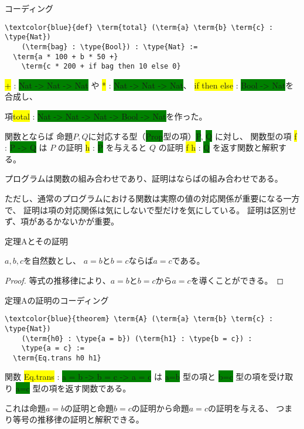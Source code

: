 \documentclass[unicode,12pt]{beamer}%
\newcommand{\type}[1]{\colorbox{green}{#1}}
\newcommand{\term}[1]{\colorbox{yellow}{#1}}
\begin{document}
\begin{frame}[fragile]{コーディング}
  \begin{tcolorbox}[title=SecondTheorems.lean]
  \setlength{\baselineskip}{12pt}
  \begin{Verbatim}[commandchars=\\\{\}, baselinestretch=1.5]
\textcolor{blue}{def} \term{total} (\term{a} \term{b} \term{c} : \type{Nat})
    (\term{bag} : \type{Bool}) : \type{Nat} :=
  \term{a * 100 + b * 50 +}
    \term{c * 200 + if bag then 10 else 0}
  \end{Verbatim}
  \end{tcolorbox}

  \term{+} : \type{Nat -> Nat -> Nat} や \term{*} : \type{Nat -> Nat -> Nat}、
  \term{if then else} : \type{Bool -> Nat}を合成し、

  項\term{total} : \type{Nat -> Nat -> Nat -> Bool -> Nat}を作った。
\end{frame}

\begin{frame}{関数とならば}
  命題$P, Q$に対応する型（\type{Prop}型の項）\type{P}, \type{Q} に対し、
  関数型の項 \term{f} : \type{P -> Q} は $P$ の証明 \term{h} : \type{P} を与えると $Q$ の証明 \term{f h} : \type{Q} を返す関数と解釈する。  

  プログラムは関数の組み合わせであり、証明はならばの組み合わせである。

  ただし、通常のプログラムにおける関数は実際の値の対応関係が重要になる一方で、
  証明は項の対応関係は気にしないで型だけを気にしている。
  証明は区別せず、項があるかないかが重要。
\end{frame}

\begin{frame}{定理Aとその証明}
  \begin{theorem}
    $a, b, c$を自然数とし、
    $a=b$と$b=c$ならば$a=c$である。
  \end{theorem}

  \begin{proof}
    等式の推移律により、$a=b$と$b=c$から$a=c$を導くことができる。    
  \end{proof}
\end{frame}

\begin{frame}[fragile]{定理Aの証明のコーディング}
  \begin{tcolorbox}[title=SecondTheorems.lean]
  \setlength{\baselineskip}{12pt}
  \begin{Verbatim}[commandchars=\\\{\}, baselinestretch=1.5]
\textcolor{blue}{theorem} \term{A} (\term{a} \term{b} \term{c} : \type{Nat})
    (\term{h0} : \type{a = b}) (\term{h1} : \type{b = c}) :
    \type{a = c} :=
  \term{Eq.trans h0 h1}
  \end{Verbatim}
  \end{tcolorbox}  

  関数 \term{Eq.trans} : \type{a = b -> b = c -> a = c} は
  \type{a=b} 型の項と \type{b=c} 型の項を受け取り \type{a=c} 型の項を返す関数である。

  これは命題$a=b$の証明と命題$b=c$の証明から命題$a=c$の証明を与える、
  つまり等号の推移律の証明と解釈できる。
\end{frame}
\end{document}
